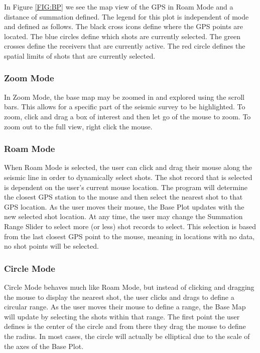 \documentclass[12pt]{article}
\begin{document}
In Figure \ref{FIG:BP} we see the map view of the GPS in Roam Mode and a distance of summation defined. The legend for this plot is independent of mode and defined as follows. The black cross icons define where the GPS points are located. The blue circles define which shots are currently selected. The green crosses define the receivers that are currently active. The red circle defines the spatial limits of shots that are currently selected.

\subsubsection{Zoom Mode}

In Zoom Mode, the base map may be zoomed in and explored using the scroll bars. This allows for a specific part of the seismic survey to be highlighted. To zoom, click and drag a box of interest and then let go of the mouse to zoom. To zoom out to the full view, right click the mouse. 

\subsubsection{Roam Mode}

When Roam Mode is selected, the user can click and drag their mouse along the seismic line in order to dynamically select shots. The shot record that is selected is dependent on the user's current mouse location. The program will determine the closest GPS station to the mouse and then select the nearest shot to that GPS location. As the user moves their mouse, the Base Plot updates with the new selected shot location. At any time, the user may change the Summation Range Slider to select more (or less) shot records to select. This selection is based from the last closest GPS point to the mouse, meaning in locations with no data, no shot points will be selected.

\subsubsection{Circle Mode}

Circle Mode behaves much like Roam Mode, but instead of clicking and dragging the mouse to display the nearest shot, the user clicks and drags to define a circular range. As the user moves their mouse to define a range, the Base Map will update by selecting the shots within that range. The first point the user defines is the center of the circle and from there they drag the mouse to define the radius. In most cases, the circle will actually be elliptical due to the scale of the axes of the Base Plot.
\end{document}
